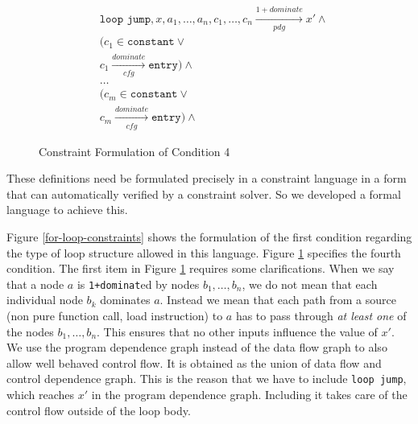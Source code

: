 

\begin{figure}[ht]
\begin{align*}
&\texttt{loop jump},x,a_1,\dots,a_n,c_1,\dots,c_n\xrightarrow[pdg]{1+dominate}x'\mathrel{\land}\\
&(c_1\in\texttt{constant}\mathrel{\lor}\\
&c_1\xrightarrow[cfg]{dominate}\texttt{entry})\mathrel{\land}\\
&\dots\\
&(c_m\in\texttt{constant}\mathrel{\lor}\\
&c_m\xrightarrow[cfg]{dominate}\texttt{entry})\mathrel{\land}
\end{align*}
\caption{Constraint Formulation of Condition 4}
\label{dom-expr-constraints}
\end{figure}

These definitions 
need be formulated precisely in a constraint language in a form that can 
automatically verified by a constraint solver.
So we  developed a
formal language  to achieve this.

Figure \ref{for-loop-constraints} shows
the formulation of the first condition regarding the type of loop structure allowed in this language.  
Figure \ref{dom-expr-constraints} specifies the fourth condition.
The first item in Figure \ref{dom-expr-constraints}  requires some clarifications.
When we say that a node $a$ is {\tt 1+dominat}ed by nodes $b_1,\dots,b_n$, we do not mean that each individual node $b_k$ dominates $a$.
Instead we mean that each path from a source (non pure function call, load instruction) to $a$ has to pass through {\em at least one} of the nodes $b_1,\dots,b_n$.
This ensures that no other inputs influence the value of $x'$.
We use the program dependence graph instead of the data flow graph to also allow well behaved control flow.
It is obtained as the union of data flow and control dependence graph.
This is the reason that we have to include \texttt{loop jump}, which reaches $x'$ in the program dependence graph.
Including it takes care of the control flow outside of the loop body.

